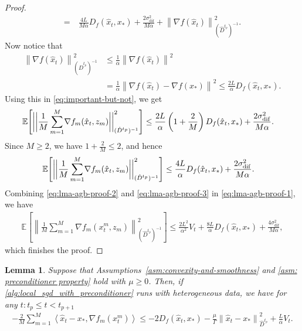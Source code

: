 \documentclass[sn-mathphys,Numbered]{sn-jnl}%
\newtheorem{lemma}{Lemma}%
\renewcommand{\|}{\parallel}
\newcommand\ec[2][]{\ensuremath{\mathbb{E}_{#1} \left[#2\right]}}
\newcommand\ecn[3][]{\ec[#1]{\norm{#2}^2_{#3}}}
\newcommand\ev[1]{\left \langle #1 \right \rangle}
\newcommand\br[1]{\left ( #1 \right )}
\newcommand{\norm}[1]{\left\lVert#1\right\rVert}
\newcommand{\sqn}[1]{{\left\lVert#1\right\rVert}^2}
\newcommand{\sigmaf}{\sigma_{\mathrm{dif}}}
\renewcommand {\*} {\ast}
\begin{document}
\begin{proof}
\begin{align}
         =&\ \frac{4L}{M\alpha} D_{f} (\hat{x}_t, x_\ast) + \frac{2 \sigmaf^2}{M\alpha} + \sqn{ \nabla f(\hat{x}_t)}_{(\hat{D}^{t_p})^{-1}}.
    \end{align}
    Now notice that
    \begin{align*}
    \sqn{\nabla f(\hat{x}_t)}_{(\hat{D}^{t_p})^{-1}} &\leq \frac{1}{\alpha}\sqn{\nabla f(\hat{x}_t)} \\ &= \frac{1}{\alpha}\sqn{\nabla f(\hat{x}_t) - \nabla f(x_\ast)} \leq \frac{2L}{\alpha} D_{f} (\hat{x}_t, x_\ast).
    \end{align*}
    Using this in \eqref{eq:important-but-not}, we get
    \begin{align*}
        \mathbb{E}\Bigg[ \bigg{|} \bigg{|}  \frac{1}{M} \sum_{m=1}^{M} &\nabla f_m (\hat{x}_t, z_m) \bigg{|} \bigg{|}^2_{(\hat{D}^{t_p})^{-1}}\Bigg] \leq \frac{2L}{\alpha} \br{1 + \frac{2}{M}} D_{f} (\hat{x}_t, x_\ast) + \frac{2 \sigmaf^2}{M\alpha}.
    \end{align*}
    Since $M \geq 2$, we have $1 + \frac{2}{M} \leq 2$, and hence
    \begin{align}
        \label{eq:lma-agb-proof-3}
        \mathbb{E}\Bigg[ \bigg{|} \bigg{|}  \frac{1}{M} \sum_{m=1}^{M} &\nabla f_m (\hat{x}_t, z_m) \bigg{|} \bigg{|}^2_{(\hat{D}^{t_p})^{-1}}\Bigg] \leq \frac{4L}{\alpha} D_{f} (\hat{x}_t, x_\ast) + \frac{2 \sigmaf^2}{M\alpha}.
    \end{align}
    Combining \eqref{eq:lma-agb-proof-2} and \eqref{eq:lma-agb-proof-3} in \eqref{eq:lma-agb-proof-1}, we have
    \begin{align*}
        \ecn{\frac{1}{M}\sum\limits_{m=1}^M \nabla f_m(x_t^m, z_m)}{(\hat{D}^{t_p})^{-1}} \leq \frac{2L^2}{\alpha^2} V_t + \frac{8L}{\alpha} D_{f} (\hat{x}_t, x_\ast) + \frac{4 \sigmaf^2}{M\alpha},
    \end{align*}
    which finishes the proof.
\end{proof}
\begin{lemma}
    \label{lemma:inner-product-bound}
    Suppose that Assumptions~\ref{asm:convexity-and-smoothness} and \ref{asm: preconditioner property} hold with $\mu \geq 0$. Then, if \cref{alg:local_sgd_with_preconditioner} runs with heterogeneous data, we have for any $t:t_p \leq t < t_{p+1}$
    \begin{align*}
         -\frac{2 }{M} \sum_{m=1}^{M} \ev{\hat{x}_t - x_\ast, \nabla f_m (x_t^m)} \leq - 2  D_{f} (\hat{x}_t, x_\ast) -  \frac{\mu}{\Gamma} \sqn{\hat{x}_t - x_\ast}_{\hat{D}^{t_p}} +  \frac{L}{\alpha} V_t.
    \end{align*}
\end{lemma}
\end{document}
